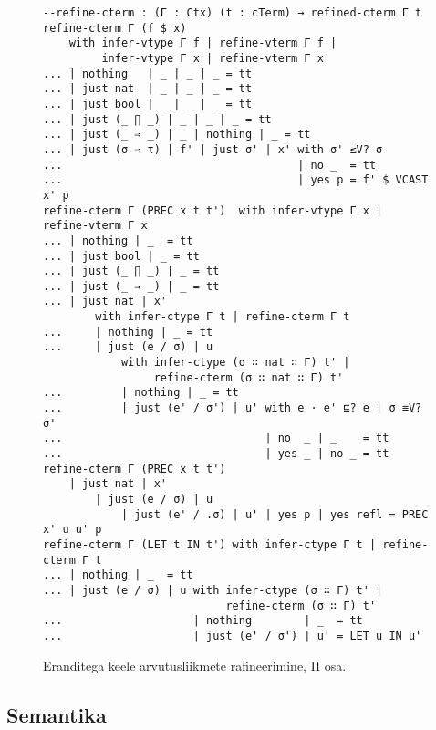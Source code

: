 \documentclass[a4paper,12pt]{article}
\begin{document}
\begin{figure}
  \begin{BVerbatim}
--refine-cterm : (Γ : Ctx) (t : cTerm) → refined-cterm Γ t
refine-cterm Γ (f $ x)
    with infer-vtype Γ f | refine-vterm Γ f |
         infer-vtype Γ x | refine-vterm Γ x
... | nothing   | _ | _ | _ = tt
... | just nat  | _ | _ | _ = tt
... | just bool | _ | _ | _ = tt
... | just (_ ∏ _) | _ | _ | _ = tt
... | just (_ ⇒ _) | _ | nothing | _ = tt  
... | just (σ ⇒ τ) | f' | just σ' | x' with σ' ≤V? σ
...                                    | no _  = tt
...                                    | yes p = f' $ VCAST x' p
refine-cterm Γ (PREC x t t')  with infer-vtype Γ x | refine-vterm Γ x
... | nothing | _  = tt
... | just bool | _ = tt
... | just (_ ∏ _) | _ = tt
... | just (_ ⇒ _) | _ = tt
... | just nat | x'
        with infer-ctype Γ t | refine-cterm Γ t 
...     | nothing | _ = tt
...     | just (e / σ) | u
            with infer-ctype (σ ∷ nat ∷ Γ) t' |
                 refine-cterm (σ ∷ nat ∷ Γ) t'
...         | nothing | _ = tt
...         | just (e' / σ') | u' with e · e' ⊑? e | σ ≡V? σ'
...                               | no  _ | _    = tt
...                               | yes _ | no _ = tt
refine-cterm Γ (PREC x t t')
    | just nat | x'
        | just (e / σ) | u
            | just (e' / .σ) | u' | yes p | yes refl = PREC x' u u' p
refine-cterm Γ (LET t IN t') with infer-ctype Γ t | refine-cterm Γ t 
... | nothing | _  = tt
... | just (e / σ) | u with infer-ctype (σ ∷ Γ) t' |
                            refine-cterm (σ ∷ Γ) t'
...                    | nothing        | _  = tt
...                    | just (e' / σ') | u' = LET u IN u'
  \end{BVerbatim}
  \caption{Eranditega keele arvutusliikmete rafineerimine, II osa.}
  \label{fig:exc.refine-cterm2}
\end{figure}

\subsection{Semantika}\label{ssec:exc.semantics}
\end{document}
